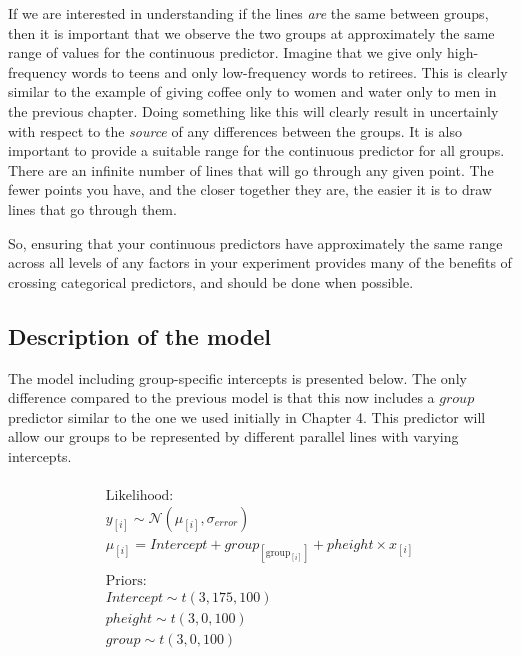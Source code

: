 \documentclass[
]{book}
\begin{document}
If we are interested in understanding if the lines \emph{are} the same between groups, then it is important that we observe the two groups at approximately the same range of values for the continuous predictor. Imagine that we give only high-frequency words to teens and only low-frequency words to retirees. This is clearly similar to the example of giving coffee only to women and water only to men in the previous chapter. Doing something like this will clearly result in uncertainly with respect to the \emph{source} of any differences between the groups. It is also important to provide a suitable range for the continuous predictor for all groups. There are an infinite number of lines that will go through any given point. The fewer points you have, and the closer together they are, the easier it is to draw lines that go through them.

So, ensuring that your continuous predictors have approximately the same range across all levels of any factors in your experiment provides many of the benefits of crossing categorical predictors, and should be done when possible.

\hypertarget{description-of-the-model-5}{%
\subsection{Description of the model}\label{description-of-the-model-5}}

The model including group-specific intercepts is presented below. The only difference compared to the previous model is that this now includes a \(group\) predictor similar to the one we used initially in Chapter 4. This predictor will allow our groups to be represented by different parallel lines with varying intercepts.

\begin{equation}
\begin{split}
\\
\textrm{Likelihood:} \\
y_{[i]} \sim \mathcal{N}(\mu_{[i]},\sigma_{error}) \\
\mu_{[i]} = Intercept + group_{[\mathrm{group}_{[i]}]} + pheight \times x_{[i]}  \\ \\
\textrm{Priors:} \\
Intercept \sim t(3, 175, 100) \\
pheight \sim t(3, 0, 100) \\ 
group \sim t(3, 0, 100) \\ 
\\
\end{split}
\label{eq:510}
\end{equation}
\end{document}
